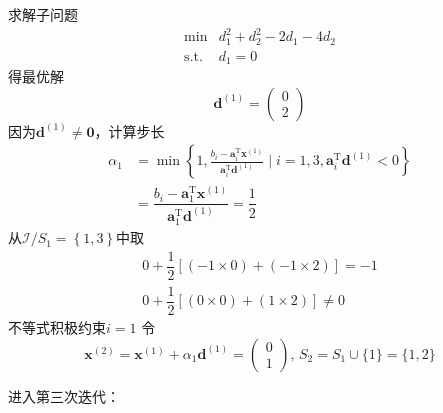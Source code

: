 \begin{example}
\begin{solution}
        求解子问题
        \[
            \begin{array}{rl}
                \operatorname*{min}&d_{1}^{2}+d_{2}^{2}-2d_{1}-4d_{2}\\
                \mathrm{s.t.}&d_{1}=0
            \end{array}
        \]
        得最优解
        \[
            \boldsymbol{d}^{(1)}=\begin{pmatrix}0\\2\end{pmatrix}
        \]  
        因为$\boldsymbol{d}^{(1)}\neq \boldsymbol{0}$，计算步长
        \[
            \begin{aligned}
                \alpha_{1}& =\min\left\{1,\frac{b_{i}-\boldsymbol{a}_{i}^{\mathrm{T}}\boldsymbol{x}^{(1)}}{\boldsymbol{a}_{i}^{\mathrm{T}}\boldsymbol{d}^{(1)}}\mid i=1,3,\boldsymbol{a}_{i}^{\mathrm{T}}\boldsymbol{d}^{(1)}<0\right\}  \\
                &=\dfrac{b_i-\boldsymbol{a}_1^{\mathrm{T}}\boldsymbol{x}^{(1)}}{\boldsymbol{a}_1^{\mathrm{T}}\boldsymbol{d}^{(1)}}=\dfrac{1}{2}
            \end{aligned}
        \]
        从$\mathcal{I}/S_{1} = \left\{ 1,3 \right\}$中取
        \[
            \begin{array}{l}
                0+\dfrac{1}{2}\left[ (-1\times 0) + (-1\times 2) \right] = -1\\
                0 + \dfrac{1}{2}\left[  (0\times 0) + (1\times 2)  \right]\neq 0
            \end{array}
        \]
        不等式积极约束$i = 1$
        令
        \[
            \boldsymbol{x}^{(2)}=\boldsymbol{x}^{(1)}+\alpha_1\boldsymbol{d}^{(1)}=\begin{pmatrix}0\\1\end{pmatrix},\,S_2 = S_1\cup \{1\} = \{1,2\}
        \]

        \colorbox{cyan!50}{进入第三次迭代：}


\end{solution}
\end{example}
